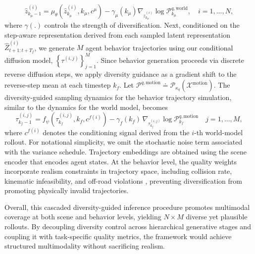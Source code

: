 \documentclass[runningheads]{llncs}
\begin{document}
\begin{equation*}
\hat{z}^{(i)}_{k_\mu -1 }=\mu_\theta(\hat{z}_{k_{\mu}}^{(i)}, {k_{\mu}}, c^\mu)-\gamma_{\mu}({k_{\mu}}) \nabla_{z_{k_{\mu}}^{(i)}} \log \mathcal{P}_{k_{\mu}}^{q, \text{world}}, \quad i=1, \ldots, N,
\end{equation*}
where $\gamma(.)$ controls the strength of diversification. Next, conditioned on the step-aware representation derived from each sampled latent representation $\hat{Z}_{t+1:t+T_f}^{(i)}$, we generate $M$ agent behavior trajectories using our conditional diffusion model, $\left\{\tau^{(i, j)}\right\}_{j=1}^M$. Since behavior generation proceeds via discrete reverse diffusion steps, we apply diversity guidance as a gradient shift to the reverse-step mean at each timestep $k_f$. Let $\mathcal P^{q,\text{motion}} \doteq \mathcal P_{\kappa_q}(\mathcal X^\text{motion})$. The diversity-guided sampling dynamics for the behavior trajectory simulation, similar to the dynamics for the world model, becomes
\begin{equation*}
\tau_{k_{f}-1}^{(i,j)} =
f_\psi(\tau_{k_f}^{(i,j)}, k_f, c^{f(i)})
- \gamma_f(k_{f})\,
\nabla_{\tau_{k_f}^{(i,j)}} \log \mathcal{P}_{k_f}^{q,\text{motion}}
\quad j=1,\ldots,M,
\end{equation*}
where $c^{f(i)}$ denotes the conditioning signal derived from the $i$-th world-model rollout. For notational simplicity, we omit the stochastic noise term associated with the variance schedule. Trajectory embeddings are obtained using the scene encoder that encodes agent states. At the behavior level, the quality weights incorporate realism constraints in trajectory space, including collision rate, kinematic infeasibility, and off-road violations \cite{gulino2023waymax}, preventing diversification from promoting physically invalid trajectories.

Overall, this cascaded diversity-guided inference procedure promotes multimodal coverage at both scene and behavior levels, yielding $N \times M$ diverse yet plausible rollouts. By decoupling diversity control across hierarchical generative stages and coupling it with task-specific quality metrics, the framework would achieve structured multimodality without sacrificing realism.


\vspace{-2mm}
\end{document}
